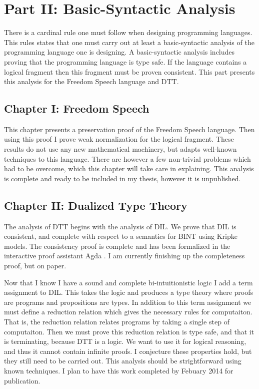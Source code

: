 \section{Part II: Basic-Syntactic Analysis}
\label{sec:syntactic_analysis}

There is a cardinal rule one must follow when designing programming
languages.  This rules states that one must carry out at least a
basic-syntactic analysis of the programming language one is designing.
A basic-syntactic analysis includes proving that the programming
language is type safe.  If the language contains a logical fragment
then this fragment must be proven consistent.  This part presents this
analysis for the Freedom Speech language and DTT.

\subsection{Chapter I: Freedom Speech}
\label{subsec:free_speech}
This chapter presents a preservation proof of the Freedom Speech
language.  Then using this proof I prove weak normalization for the
logical fragment.  These results do not use any new mathematical
machinery, but adapts well-known techniques to this language.  There
are however a few non-trivial problems which had to be overcome, which
this chapter will take care in explaining.  This analysis is complete
and ready to be included in my thesis, however it is unpublished.

\subsection{Chapter II: Dualized Type Theory}
\label{subsec:dtt}
The analysis of DTT begins with the analysis of DIL.  We prove that
DIL is consistent, and complete with respect to a semantics for BINT
using Kripke models.  The consistency proof is complete and has been
formalized in the interactive proof assistant Agda \cite{Norell:2007}.
I am currently finishing up the completeness proof, but on paper.

Now that I know I have a sound and complete bi-intuitionistic logic
I add a term assignment to DIL.  This takes the logic and produces a
type theory where proofs are programs and propositions are types.  In
addition to this term assignment we must define a reduction relation
which gives the necessary rules for computaiton.  That is, the
reduction relation relates programs by taking a single step of
computaiton. Then we must prove this reduction relation is type safe,
and that it is terminating, because DTT is a logic.  We want to use it
for logical reasoning, and thus it cannot contain infinite proofs.  I
conjecture these properties hold, but they still need to be carried
out.  This analysis should be strightforward using known techniques.
I plan to have this work completed by Febuary 2014 for publication.

